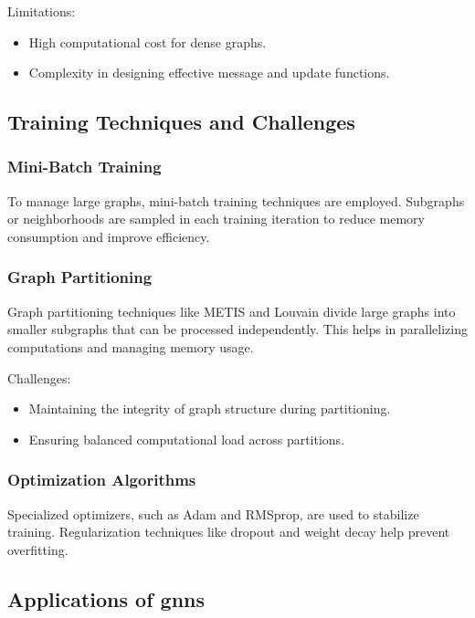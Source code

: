 Limitations:
\begin{itemize}
    \item High computational cost for dense graphs.
    \item Complexity in designing effective message and update functions.
\end{itemize}

\subsection*{Training Techniques and Challenges}

\subsubsection*{Mini-Batch Training}

To manage large graphs, mini-batch training techniques are employed. Subgraphs or neighborhoods are sampled in each training iteration to reduce memory consumption and improve efficiency.

\subsubsection*{Graph Partitioning}

Graph partitioning techniques like METIS and Louvain divide large graphs into smaller subgraphs that can be processed independently. This helps in parallelizing computations and managing memory usage.

Challenges:
\begin{itemize}
    \item Maintaining the integrity of graph structure during partitioning.
    \item Ensuring balanced computational load across partitions.
\end{itemize}

\subsubsection*{Optimization Algorithms}

Specialized optimizers, such as Adam and RMSprop, are used to stabilize training. Regularization techniques like dropout and weight decay help prevent overfitting.

\subsection*{Applications of \glspl{gnn}}

